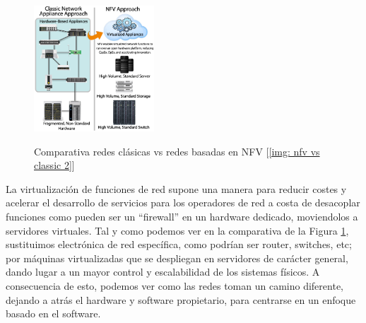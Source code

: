 \documentclass[12pt]{article}
\begin{document}
	\begin{figure}[h!]
		\begin{center}
			\includegraphics[width=0.4\textwidth]{img/NFV-image-v2.jpg}
			\label{img: comparativa redes classic vs nfv}
			\caption{Comparativa redes clásicas vs redes basadas en NFV [\ref{img: nfv vs classic 2}]}
		\end{center}
	\end{figure}

	\noindent La virtualización de funciones de red supone una manera para reducir costes y acelerar el desarrollo de servicios para los operadores de red a costa de desacoplar funciones como pueden ser un ``firewall'' en un hardware dedicado, moviendolos a servidores virtuales. Tal y como podemos ver en la comparativa de la Figura \ref{img: comparativa redes classic vs nfv}, sustituimos electrónica de red específica, como podrían ser router, switches, etc; por máquinas virtualizadas que se despliegan en servidores de carácter general, dando lugar a un mayor control y escalabilidad de los sistemas físicos. A consecuencia de esto, podemos ver como las redes toman un camino diferente, dejando a atrás el hardware y software propietario, para centrarse en un enfoque basado en el software. \\
	
	\pagebreak
	
\end{document}
